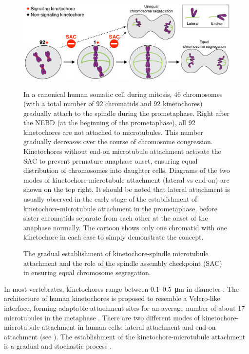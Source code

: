 \begin{figure}
    \centering
    \includegraphics[width=\textwidth]{chapters/figures/SACRole.pdf}
    \caption{The gradual establishment of kinetochore-spindle microtubule attachment and the role of the spindle assembly checkpoint (SAC) in ensuring equal chromosome segregation.}
    \noindent\justifying In a canonical human somatic cell during mitosis, 46 chromosomes (with a total number of 92 chromatids and 92 kinetochores) gradually attach to the spindle during the prometaphase. Right after the NEBD (at the beginning of the prometaphase), all 92 kinetochores are not attached to microtubules. This number gradually decreases over the course of chromosome congression. Kinetochores without end-on microtubule attachment activate the SAC to prevent premature anaphase onset, ensuring equal distribution of chromosomes into daughter cells. Diagrams of the two modes of kinetochore-microtubule attachment (lateral vs end-on) are shown on the top right. It should be noted that lateral attachment is usually observed in the early stage of the establishment of kinetochore-microtubule attachment in the prometaphase, before sister chromatids separate from each other at the onset of the anaphase normally. The cartoon shows only one chromatid with one kinetochore in each case to simply demonstrate the concept.
    \label{SACRole}
\end{figure}

In most vertebrates, kinetochores range between 0.1--\SI{0.5}{\micro m} in diameter \cite{Rieder+Salmon1998}. The architecture of human kinetochores is proposed to resemble a Velcro-like interface, forming adaptable attachment sites for an average number of about 17 microtubules in the metaphase \cite{Wendell1993, Zaytsev2014, Zaytsev2015, Velcro, Kukreja2020}. There are two different modes of kinetochore-microtubule attachment in human cells: lateral attachment and end-on attachment (see ). The establishment of the kinetochore-microtubule attachment is a gradual and stochastic process \cite{GradualStochastic}.

